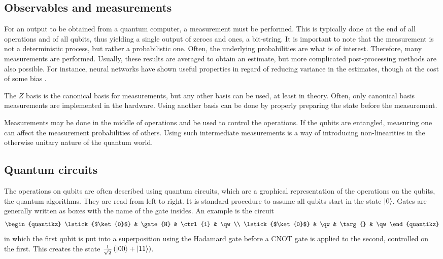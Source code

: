 \subsection{Observables and measurements}
For an output to be obtained from a quantum computer, a measurement must be performed.
This is typically done at the end of all operations and of all qubits, thus yielding a single output of zeroes and ones, a bit-string.
It is important to note that the measurement is not a deterministic process, but rather a probabilistic one.
Often, the underlying probabilities are what is of interest.
Therefore, many measurements are performed.
Usually, these results are averaged to obtain an estimate, but more complicated post-processing methods are also possible.
For instance, neural networks have shown useful properties in regard of reducing variance in the estimates, though at the cost of some bias \cite{torlai2020}.

The $Z$ basis is the canonical basis for measurements, but any other basis can be used, at least in theory.
Often, only canonical basis measurements are implemented in the hardware.
Using another basis can be done by properly preparing the state before the measurement.

Measurements may be done in the middle of operations and be used to control the operations.
If the qubits are entangled, measuring one can affect the measurement probabilities of others.
Using such intermediate measurements is a way of introducing non-linearities in the otherwise unitary nature of the quantum world.


\subsection{Quantum circuits}
The operations on qubits are often described using quantum circuits, which are a graphical representation of the operations on the qubits, the quantum algorithms.
They are read from left to right.
It is standard procedure to assume all qubits start in the state $\ket{0}$.
Gates are generally written as boxes with the name of the gate insides.
An example is the circuit
\begin{equation}
  \begin{quantikz}
    \lstick{$\ket{0}$} & \gate{H} & \ctrl{1} & \qw \\
    \lstick{$\ket{0}$} & \qw & \targ{} & \qw
  \end{quantikz}
\end{equation}
in which the first qubit is put into a superposition using the Hadamard gate before a CNOT gate is applied to the second, controlled on the first.
This creates the state $\frac{1}{\sqrt{2}}\left(\ket{00} + \ket{11}\right)$.

